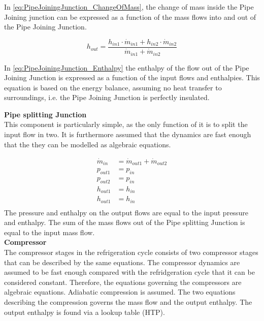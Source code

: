 In \cref{eq:PipeJoiningJunction_ChangeOfMass}, the change of mass inside the Pipe Joining junction can be expressed as a function of the mass flows into and out of the Pipe Joining Junction. 

\begin{equation} \label{eq:PipeJoiningJunction_Enthalpy}
	h_{out} = \frac{h_{in1} \cdot \dot{m}_{in1} + h_{in2} \cdot \dot{m}_{in2}}{ \dot{m}_{in1} + \dot{m}_{in2} }
\end{equation}

In \cref{eq:PipeJoiningJunction_Enthalpy} the enthalpy of the flow out of the Pipe Joining Junction is expressed as a function of the input flows and enthalpies. This equation is based on the energy balance, assuming no heat transfer to surroundings, i.e. the Pipe Joining Junction is perfectly insulated.

\textbf{Pipe splitting Junction} \\
This component is particularly simple, as the only function of it is to split the input flow in two. It is furthermore assumed that the dynamics are fast enough that the they can be modelled as algebraic equations.

\begin{equation} \label{eq:PipeSplittingJunction_Enthalpy}
	\begin{split}
		\dot{m}_{in} &= \dot{m}_{out1} + \dot{m}_{out2} \\
		p_{out1} &= p_{in} \\
		p_{out2} &= p_{in} \\
		h_{out1} &= h_{in} \\
		h_{out1} &= h_{in} \\
	\end{split}
\end{equation}
The pressure and enthalpy on the output flows are equal to the input pressure and enthalpy. The sum of the mass flows out of the Pipe splitting Junction is equal to the input mass flow. \\

\textbf{Compressor} \\
The compressor stages in the refrigeration cycle consists of two compressor stages that can be described by the same equations.
The compressor dynamics are assumed to be fast enough compared with the refridgeration cycle that it can be considered constant. Therefore, the equations governing the compressors are algebraic equations. 
Adiabatic compression is assumed. 
The two equations describing the compression governs the mass flow and the output enthalpy. The output enthalpy is found via a lookup table (HTP). 

